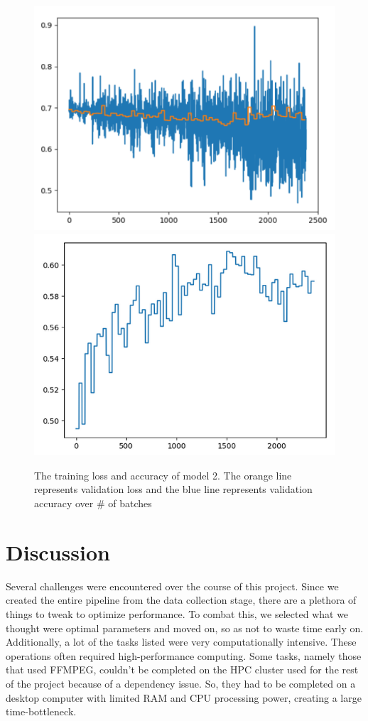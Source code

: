 \documentclass[10pt,twocolumn,letterpaper]{article}
\begin{document}
\begin{figure}
\includegraphics[scale=.6]{trainingloss.png}
\includegraphics[scale=.6]{trainingacc.png}
\caption{The training loss and accuracy of model 2. The orange line represents validation loss and the blue line represents validation accuracy over \# of batches}
\centering
\end{figure}

\section{Discussion}

Several challenges were encountered over the course of this project.
Since we created the entire pipeline from the data collection stage, there are a plethora of things to tweak to optimize performance.
To combat this, we selected what we thought were optimal parameters and moved on, so as not to waste time early on.
Additionally, a lot of the tasks listed were very computationally intensive.
These operations often required high-performance computing.
Some tasks, namely those that used FFMPEG, couldn't be completed on the HPC cluster used for the rest of the project because of a dependency issue.
So, they had to be completed on a desktop computer with limited RAM and CPU processing power, creating a large time-bottleneck.
\end{document}
